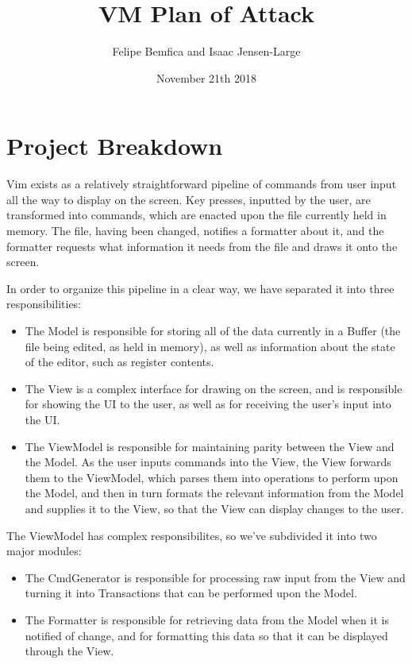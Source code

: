 \documentclass[12pt]{article}
\title{VM Plan of Attack}
\author{Felipe Bemfica and Isaac Jensen-Large}
\date{November 21th 2018}
\begin{document}
\begin{titlepage}
\maketitle
\end{titlepage}

\section{Project Breakdown}

Vim exists as a relatively straightforward pipeline of commands
from user input all the way to display on the screen. Key presses,
inputted by the user, are transformed into commands, which are
enacted upon the file currently held in memory. The file, having
been changed, notifies a formatter about it, and the formatter
requests what information it needs from the file and draws it onto
the screen.

In order to organize this pipeline in a clear way, we have separated
it into three responsibilities:

\begin{itemize}
	\item The Model is responsible for storing all of the data
		currently in a Buffer (the file being edited, as
		held in memory), as well as information about the
		state of the editor, such as register contents.
	\item The View is a complex interface for drawing on the screen,
		and is responsible for showing the UI to the user, as
		well as for receiving the user's input into the UI.
	\item The ViewModel is responsible for maintaining parity between
		the View and the Model. As the user inputs commands
		into the View, the View forwards them to the ViewModel,
		which parses them into operations to perform upon the
		Model, and then in turn formats the relevant information
		from the Model and supplies it to the View, so that the
		View can display changes to the user.
\end{itemize}

The ViewModel has complex responsibilites, so we've subdivided it into
two major modules:

\begin{itemize}
	\item The CmdGenerator is responsible for processing raw input
		from the View and turning it into Transactions that can be
		performed upon the Model.
	\item The Formatter is responsible for retrieving data from the
		Model when it is notified of change, and for formatting
		this data so that it can be displayed through the View.
\end{itemize}
\end{document}
